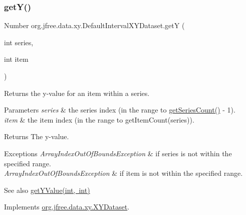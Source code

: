 \subsubsection{\texorpdfstring{get\+Y()}{getY()}}
{\footnotesize\ttfamily Number org.\+jfree.\+data.\+xy.\+Default\+Interval\+X\+Y\+Dataset.\+getY (\begin{DoxyParamCaption}\item[{int}]{series,  }\item[{int}]{item }\end{DoxyParamCaption})}

Returns the y-\/value for an item within a series.


\begin{DoxyParams}{Parameters}
{\em series} & the series index (in the range {} to {\ttfamily \mbox{\hyperlink{classorg_1_1jfree_1_1data_1_1xy_1_1_default_interval_x_y_dataset_a11470bfa9b540c971123d4282c0f5a8a}{get\+Series\+Count()}} -\/ 1}). \\
\hline
{\em item} & the item index (in the range {} to {\ttfamily get\+Item\+Count(series)}).\\
\hline
\end{DoxyParams}
\begin{DoxyReturn}{Returns}
The y-\/value.
\end{DoxyReturn}

\begin{DoxyExceptions}{Exceptions}
{\em Array\+Index\+Out\+Of\+Bounds\+Exception} & if {\ttfamily series} is not within the specified range. \\
\hline
{\em Array\+Index\+Out\+Of\+Bounds\+Exception} & if {\ttfamily item} is not within the specified range.\\
\hline
\end{DoxyExceptions}
\begin{DoxySeeAlso}{See also}
\mbox{\hyperlink{classorg_1_1jfree_1_1data_1_1xy_1_1_default_interval_x_y_dataset_a924e1f58152217e3648fbe6cdc64bf34}{get\+Y\+Value(int, int)}} 
\end{DoxySeeAlso}


Implements \mbox{\hyperlink{interfaceorg_1_1jfree_1_1data_1_1xy_1_1_x_y_dataset_aa915867221e0f94021bad3140db5254e}{org.\+jfree.\+data.\+xy.\+X\+Y\+Dataset}}.

\mbox{\label{classorg_1_1jfree_1_1data_1_1xy_1_1_default_interval_x_y_dataset_a924e1f58152217e3648fbe6cdc64bf34}} 
